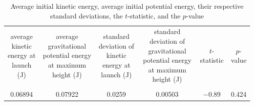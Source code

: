 \begin{table}
  \caption{Average initial kinetic energy, average initial potential energy, their respective standard deviations, the $t$-statistic, and the $p$-value}
  \label{tab:7}
  \begin{center}
    \begin{ruledtabular}
      \begin{tabular}{cccccc}
        {average kinetic energy at launch (\unit{\joule})} &
        {average gravitational potential energy at maximum height (\unit{\joule})} &
        {standard deviation of kinetic energy at launch (\unit{\joule})} &
        {standard deviation of gravitational potential energy at maximum height (\unit{\joule})} &
        {$t$-statistic} & {$p$-value} \\
        \colrule \\
        \num{0.06894} & \num{0.07922} & \num{0.0259} & \num{0.00503} & \num{-0.89} & \num{0.424} \\
      \end{tabular}
    \end{ruledtabular}
  \end{center}
\end{table}
